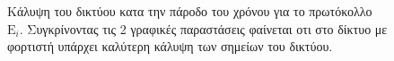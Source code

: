 \begin{figure}[H]
  \centering
  \caption{Κάλυψη του δικτύου κατα την πάροδο του χρόνου για το πρωτόκολλο $\text{E}_{i}$. Συγκρίνοντας τις 2 γραφικές παραστάσεις φαίνεται οτι στο δίκτυο με φορτιστή
υπάρχει καλύτερη κάλυψη των σημείων του δικτύου.}
  \label{fig:1exp_3_3}
\end{figure}





